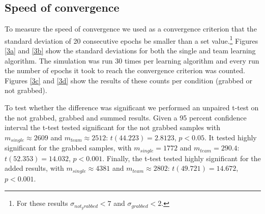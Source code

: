 \subsection{Speed of convergence}
To measure the speed of convergence we used as a convergence criterion that the standard deviation of 20 consecutive epochs be smaller than a set value.\footnote{For these results $\sigma_{not_grabbed} < 7$ and $\sigma_{grabbed} < 2$.} Figures \ref{3a} and \ref{3b} show the standard deviations for both the single and team learning algorithm. The simulation was run 30 times per learning algorithm and every run the number of epochs it took to reach the convergence criterion was counted. Figures \ref{3c} and \ref{3d} show the results of these counts per condition (grabbed or not grabbed).

To test whether the difference was significant we performed an unpaired t-test on the not grabbed, grabbed and summed results. Given a 95 percent confidence interval the t-test tested significant for the not grabbed samples with $m_{single} \approx 2609$ and $m_{team} \approx 2512$: $t(44.223) = 2.8123$, $p < 0.05$. It tested highly significant for the grabbed samples, with $m_{single} = 1772$ and $m_{team} = 290.4$: $t(52.353) = 14.032$, $p<0.001$. Finally, the t-test tested highly significant for the added results, with $m_{single} \approx 4381$ and $m_{team} \approx 2802$: $t(49.721) = 14.672$, $p < 0.001$. 
